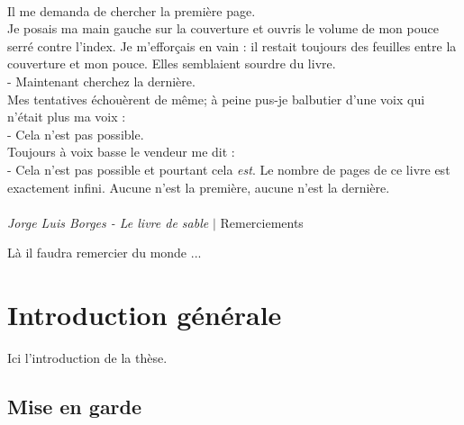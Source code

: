 \documentclass[symmetric,justified,marginals=raggedouter]{tufte-book}
\begin{document}
\thispagestyle{empty}%
\clearpage%


\newpage

~\vfill
\noindent
\par\noindent Il me demanda de chercher la première page.\\
\noindent Je posais ma main gauche sur la couverture et ouvris le volume de mon pouce serré contre l'index. Je m'efforçais en vain : il restait toujours des feuilles entre la couverture et mon pouce. Elles semblaient sourdre du livre.\\
- Maintenant cherchez la dernière.\\
\noindent Mes tentatives échouèrent de même; à peine pus-je balbutier d'une voix qui n'était plus ma voix :\\
- Cela n'est pas possible.\\
\noindent Toujours à voix basse le vendeur me dit : \\
- Cela n'est pas possible et pourtant cela \textit{est}. Le nombre de pages de ce livre est exactement infini. Aucune n'est la première, aucune n'est la dernière.
\\~\\
\noindent\textit{Jorge Luis Borges - Le livre de sable} 
\vfill
\indent
\newpage
\begingroup
\vspace*{8em}
\huge $\vert$ \huge Remerciements
\vspace*{4em}
\par\normalsize Là il faudra remercier du monde ...
\endgroup
\vfill


\tableofcontents

\listoffigures

\listoftables

\mainmatter


\chapter{Introduction générale}
\label{chap:1}

\noindent Ici l'introduction de la thèse.

\section{Mise en garde}
\label{sec:1_mise_en_garde}
\end{document}
